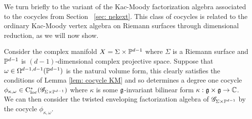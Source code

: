 %
%
%


We turn briefly to the variant of the Kac-Moody factorization algebra associated to the cocycles from Section ~\ref{sec: nekext}.
This class of cocycles is related to the ordinary Kac-Moody vertex algebra on Riemann surfaces through dimensional reduction, as we will now show. 

Consider the complex manifold $X = \Sigma \times \mathbb P^{d-1}$ where $\Sigma$ is a Riemann surface and $\mathbb P^{d-1}$ is $(d-1)$-dimensional complex projective space.
Suppose that $\omega \in \Omega^{d-1,d-1}(\mathbb P^{d-1})$ is the natural volume form, this clearly satisfies the conditions of Lemma \ref{lem: cocycle KM} and so determines a degree one cocycle $\phi_{\kappa, \omega} \in {\rm C}_{\rm loc}^*(\mathscr G_{\Sigma \times \mathbb P^{d-1}})$ where $\kappa$ is some $\mathfrak g$-invariant bilinear form $\kappa : \mathfrak g \times \mathfrak g \to \mathbb C$. 
We can then consider the twisted enveloping factorization algebra of $\mathscr G_{\Sigma \times \mathbb P^{d-1}}$ by the cocycle $\phi_{\kappa, \omega}$. 


